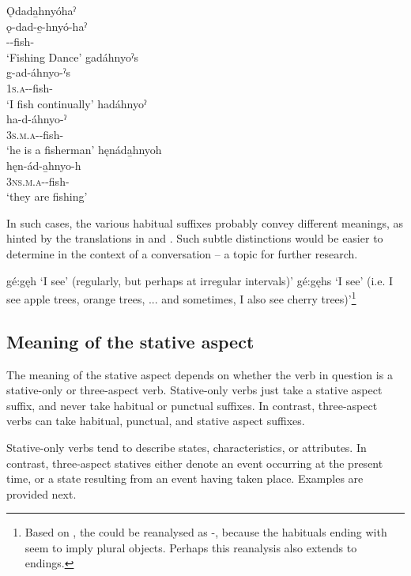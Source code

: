 \ea\label{ex:morehabitualex2}
\ea Ǫdada̱hnyóhaˀ\\
\gll ǫ-dad-e̱-hnyó-haˀ\\
 -{}-fish-{\habitual}\\
\glt `Fishing Dance'
\ex gadáhnyoˀs\\
\gll g-ad-áhnyo-ˀs\\
 \textsc{1s.a}-{\semireflexive}-fish-{\habitual}\\
\glt `I fish continually'
\ex hadáhnyoˀ\\
\gll ha-d-áhnyo-ˀ\\
 \textsc{3s.m.a}-{\semireflexive}-fish-{\habitual}\\
\glt `he is a fisherman'
\ex hęnáda̱hnyoh\\
\gll hęn-ád-a̱hnyo-h\\
 \textsc{3ns.m.a}-{\semireflexive}-fish-{\habitual}\\
\glt `they are fishing'
\z
\z

In such cases, the various habitual suffixes probably convey different meanings, as hinted by the translations in  and . Such subtle distinctions would be easier to determine in the context of a conversation -- a topic for further research.

\ea\label{ex:morehabitualex3}
\ea gé:gęh ‘I see’ (regularly, but perhaps at irregular intervals)’
\ex gé:gęhs ‘I see’ (i.e. I see apple trees, orange trees, ... and sometimes, I also see cherry trees)’\footnote{Based on , the  \textsc{\habitual} could be reanalysed as  {\habitual}-{\plural}, because the habituals ending with  seem to imply plural objects. Perhaps this reanalysis also extends to   \textsc{\habitual} endings.}
\z
\z

\subsection{Meaning of the stative aspect} \label{Meaning of the stative aspect}
The meaning of the stative aspect depends on whether the  verb in question is a stative-only or three-aspect verb. Stative-only verbs just take a stative aspect suffix, and never take habitual or punctual suffixes. In contrast, three-aspect verbs can take habitual, punctual, and stative aspect suffixes. 

Stative-only verbs tend to describe states, characteristics, or attributes. In contrast, three-aspect statives either denote an event occurring at the present time, or a state resulting from an event having taken place. Examples are provided next.




